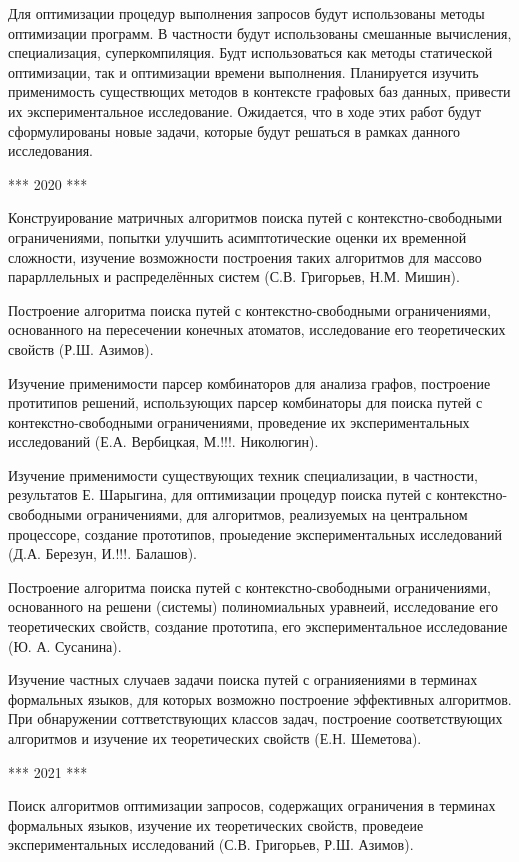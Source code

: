 \documentclass[12pt]{article}  %
\theoremstyle{remark}
\begin{document}
Для оптимизации процедур выполнения запросов будут использованы методы оптимизации программ. В частности будут использованы смешанные вычисления, специализация, суперкомпиляция. Будт использоваться как методы статической оптимизации, так и оптимизации времени выполнения. Планируется изучить применимость существющих методов в контексте графовых баз данных, привести их экспериментальное исследование. Ожидается, что в ходе этих работ будут сформулированы новые задачи, которые будут решаться в рамках данного исследования.

*** 2020 ***

Конструирование матричных алгоритмов поиска путей с контекстно-свободными ограничениями, попытки улучшить асимптотические оценки их временной сложности, изучение возможности построения таких алгоритмов для массово парарллельных и распределённых систем (С.В. Григорьев, Н.М. Мишин).

Построение алгоритма поиска путей с контекстно-свободными ограничениями, основанного на пересечении конечных атоматов, исследование его теоретических свойств (Р.Ш. Азимов).

Изучение применимости парсер комбинаторов для анализа графов, построение протитипов решений, использующих парсер комбинаторы для поиска путей с контекстно-свободными ограничениями, проведение их экспериментальных исследований (Е.А. Вербицкая, М.!!!. Николюгин).

Изучение применимости существующих техник специализации, в частности, результатов Е. Шарыгина, для оптимизации процедур поиска путей с контекстно-свободными ограничениями, для алгоритмов, реализуемых на центральном процессоре, создание прототипов, проыедение экспериментальных исследований (Д.А. Березун, И.!!!. Балашов).

Построение алгоритма поиска путей с контекстно-свободными ограничениями, основанного на решени (системы) полиномиальных уравнеий, исследование его теоретических свойств, создание прототипа, его экспериментальное исследование (Ю. А. Сусанина).

Изучение частных случаев задачи поиска путей с огранияениями в терминах формальных языков, для которых возможно построение эффективных алгоритмов. При обнаружении соттветствующих классов задач, построение соответствующих алгоритмов и изучение их теоретических свойств (Е.Н. Шеметова).


*** 2021 ***

Поиск алгоритмов оптимизации запросов, содержащих ограничения в терминах формальных языков, изучение их теоретических свойств, проведеие экспериментальных исследований (С.В. Григорьев, Р.Ш. Азимов).
\end{document}
